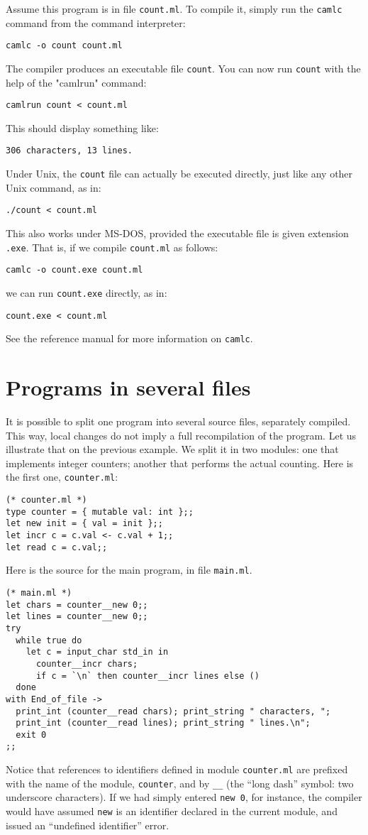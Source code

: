 Assume this program is in file \verb"count.ml". To compile it, simply
run the \verb"camlc" command from the command interpreter:
\begin{verbatim}
camlc -o count count.ml
\end{verbatim}
The compiler produces an executable file \verb"count". You can now run
\verb"count" with the help of the "camlrun" command:
\begin{verbatim}
camlrun count < count.ml
\end{verbatim}
This should display something like:
\begin{verbatim}
306 characters, 13 lines.
\end{verbatim}
Under Unix, the \verb"count" file can actually be executed directly,
just like any other Unix command, as in:
\begin{verbatim}
./count < count.ml
\end{verbatim}
This also works under MS-DOS, provided the executable file is given
extension \verb".exe". That is, if we compile \verb"count.ml" as follows:
\begin{verbatim}
camlc -o count.exe count.ml
\end{verbatim}
we can run \verb"count.exe" directly, as in:
\begin{verbatim}
count.exe < count.ml
\end{verbatim}
See the reference manual for more information on \verb"camlc".

\section{Programs in several files}\label{s:modules}

It is possible to split one program into several source files,
separately compiled. This way, local changes do not imply a full
recompilation of the program. Let us illustrate that on the previous
example. We split it in two modules: one that implements integer
counters; another that performs the actual counting. Here is the first
one, \verb"counter.ml":
\begin{verbatim}
(* counter.ml *)
type counter = { mutable val: int };;
let new init = { val = init };;
let incr c = c.val <- c.val + 1;;
let read c = c.val;;
\end{verbatim}
Here is the source for the main program, in file \verb"main.ml".
\begin{verbatim}
(* main.ml *)
let chars = counter__new 0;;
let lines = counter__new 0;;
try
  while true do
    let c = input_char std_in in
      counter__incr chars;
      if c = `\n` then counter__incr lines else ()
  done
with End_of_file ->
  print_int (counter__read chars); print_string " characters, ";
  print_int (counter__read lines); print_string " lines.\n";
  exit 0
;;
\end{verbatim}
Notice that references to identifiers defined in module
\verb"counter.ml" are prefixed with the name of the module,
\verb"counter", and by \verb"__" (the ``long dash'' symbol: two
underscore characters). If we had simply entered \verb"new 0", for
instance, the compiler would have assumed \verb"new" is an identifier
declared in the current module, and issued an ``undefined identifier''
error.

